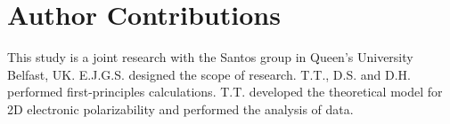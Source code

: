\section{Author Contributions}
\label{sec:diel-author-contributions}
This study is a joint research with the Santos group in Queen's
University Belfast, UK. E.J.G.S. designed the scope of research. T.T.,
D.S. and D.H. performed first-principles calculations. T.T. developed
the theoretical model for 2D electronic polarizability and performed
the analysis of data.








